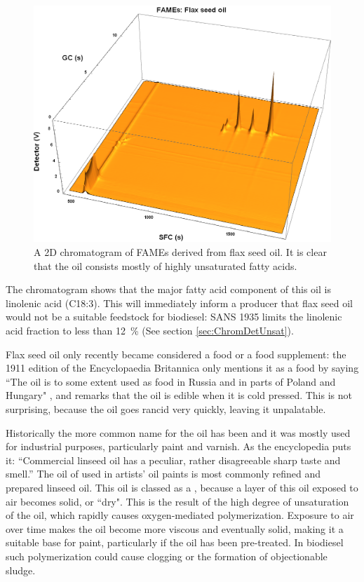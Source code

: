 \begin{figure}
\centering
\includegraphics[width=\textwidth]{Figures/Flax44.png}
\decoRule

\caption[SFC×GC of flax seed oil]{A 2D chromatogram of FAMEs derived from
flax seed oil. It is clear that the oil consists mostly of highly unsaturated fatty
acids.}

\label{fig:2DFlax}
\end{figure}

The chromatogram shows that the major fatty acid component of this oil is
linolenic acid (C18:3). This will immediately inform a producer that flax seed
oil would not be a suitable feedstock for biodiesel: SANS 1935 limits the
linolenic acid fraction to less than \SI{12}{\percent} (See section
\ref{sec:ChromDetUnsat}).

Flax seed oil only recently became considered a food or a food supplement: the
1911 edition of the Encyclopaedia Britannica only mentions it as a food by
saying ``The oil is to some extent used as food in Russia and in parts of Poland
and Hungary" \autocite{Linseed1911}, and remarks that the oil is edible when it
is cold pressed. This is not surprising, because the oil goes rancid very
quickly, leaving it unpalatable.

Historically the more common name for the oil has been  and
it was mostly used for industrial purposes, particularly paint and varnish.
As the encyclopedia puts it: ``Commercial linseed oil has a peculiar, rather
disagreeable sharp taste and smell.'' The oil of used in artists' oil paints is
most commonly refined and prepared linseed oil. This oil is classed as a
, because a layer of this oil exposed to air becomes solid,
or ``dry". This is the result of the high degree of unsaturation of the oil,
which rapidly causes oxygen-mediated polymerization. Exposure to air over time
makes the oil become more viscous and eventually solid, making it a suitable
base for paint, particularly if the oil has been pre-treated. In biodiesel such
polymerization could cause clogging or the formation of objectionable sludge.


